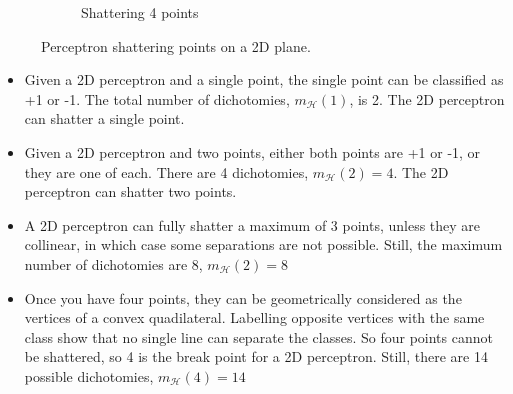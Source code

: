 \begin{figure}[h!]
    \hfill
    \begin{subfigure}[b]{0.2\textwidth}
        \centering
        \caption{Shattering 4 points}
    \end{subfigure}
    \caption{Perceptron shattering points on a 2D plane.}
    \label{fig:2d_perceptron}
\end{figure}

\begin{itemize}
    \item Given a 2D perceptron and a single point, the single point can be classified as +1 or -1. The total number of dichotomies, $m_\mathcal{H}(1)$, is 2. The 2D perceptron can shatter a single point.
    \item Given a 2D perceptron and two points, either both points are +1 or -1, or they are one of each. There are 4 dichotomies, $m_\mathcal{H}(2)= 4$. The 2D perceptron can shatter two points.
    \item A 2D perceptron can fully shatter a maximum of 3 points, unless they are collinear, in which case some separations are not possible. Still, the maximum number of dichotomies are 8, $m_\mathcal{H}(2)= 8$
    \item Once you have four points, they can be geometrically considered as the vertices of a convex quadilateral. Labelling opposite vertices with the same class show that no single line can separate the classes. So four points cannot be shattered, so 4 is the break point for a 2D perceptron. Still, there are 14 possible dichotomies, $m_\mathcal{H}(4)=14  $
\end{itemize}

